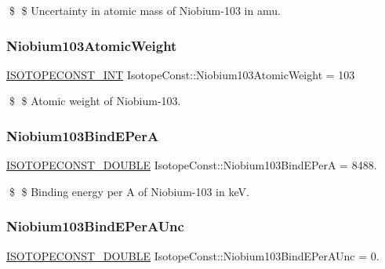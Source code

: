 \$ \$ Uncertainty in atomic mass of Niobium-\/103 in amu. \mbox{\label{group___isotope_const-_niobium-_nb103_gaf319d611f512c0e18e0d45daf6c60d9b}} 
\subsubsection{\texorpdfstring{Niobium103\+Atomic\+Weight}{Niobium103AtomicWeight}}
{\footnotesize\ttfamily \mbox{\hyperlink{group___isotope_const-_macros_ga5f18360b3e99483a35c32d789e62621c}{I\+S\+O\+T\+O\+P\+E\+C\+O\+N\+S\+T\+\_\+\+I\+NT}} Isotope\+Const\+::\+Niobium103\+Atomic\+Weight = 103}

\$ \$ Atomic weight of Niobium-\/103. \mbox{\label{group___isotope_const-_niobium-_nb103_ga43223c880edad3aafde03f828d1d3b06}} 
\subsubsection{\texorpdfstring{Niobium103\+Bind\+E\+PerA}{Niobium103BindEPerA}}
{\footnotesize\ttfamily \mbox{\hyperlink{group___isotope_const-_macros_ga8f45a7272ce02c0b4c65c44636ed719a}{I\+S\+O\+T\+O\+P\+E\+C\+O\+N\+S\+T\+\_\+\+D\+O\+U\+B\+LE}} Isotope\+Const\+::\+Niobium103\+Bind\+E\+PerA = 8488.}

\$ \$ Binding energy per A of Niobium-\/103 in keV. \mbox{\label{group___isotope_const-_niobium-_nb103_ga2dda3b565bca1d35a8016d01c5baca35}} 
\subsubsection{\texorpdfstring{Niobium103\+Bind\+E\+Per\+A\+Unc}{Niobium103BindEPerAUnc}}
{\footnotesize\ttfamily \mbox{\hyperlink{group___isotope_const-_macros_ga8f45a7272ce02c0b4c65c44636ed719a}{I\+S\+O\+T\+O\+P\+E\+C\+O\+N\+S\+T\+\_\+\+D\+O\+U\+B\+LE}} Isotope\+Const\+::\+Niobium103\+Bind\+E\+Per\+A\+Unc = 0.}

